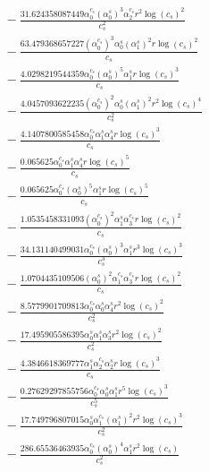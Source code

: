 \documentclass[10pt]{article}
\begin{document}
\begin{align*}
&{}  - \frac{31.624358087449 \alpha_{0}^{c_s} \left(\alpha_{0}^s\right)^{3} \alpha_{2}^{c_s} r^{2} \log{\left(c_{s} \right)}^{2}}{c_{s}^{2}} \\
&{}  - \frac{63.479368657227 \left(\alpha_{0}^{c_s}\right)^{3} \alpha_{0}^s \left(\alpha_{1}^s\right)^{2} r \log{\left(c_{s} \right)}^{2}}{c_{s}} \\
&{}  - \frac{4.0298219544359 \alpha_{0}^{c_s} \left(\alpha_{0}^s\right)^{5} \alpha_{1}^s r \log{\left(c_{s} \right)}^{3}}{c_{s}} \\
&{}  - \frac{4.0457093622235 \left(\alpha_{0}^{c_s}\right)^{2} \alpha_{0}^s \left(\alpha_{1}^s\right)^{2} r^{2} \log{\left(c_{s} \right)}^{4}}{c_{s}^{2}} \\
&{}  - \frac{4.1407800585458 \alpha_{0}^{c_s} \alpha_{1}^s \alpha_{4}^s r \log{\left(c_{s} \right)}^{3}}{c_{s}} \\
&{}  - \frac{0.065625 \alpha_{0}^{c_s} \alpha_{1}^s \alpha_{4}^s r \log{\left(c_{s} \right)}^{5}}{c_{s}} \\
&{}  - \frac{0.065625 \alpha_{0}^{c_s} \left(\alpha_{0}^s\right)^{5} \alpha_{1}^s r \log{\left(c_{s} \right)}^{5}}{c_{s}} \\
&{}  - \frac{1.0535458331093 \left(\alpha_{0}^{c_s}\right)^{2} \alpha_{1}^s \alpha_{3}^{c_s} r \log{\left(c_{s} \right)}^{2}}{c_{s}} \\
&{}  - \frac{34.131140499031 \alpha_{0}^{c_s} \left(\alpha_{0}^s\right)^{3} \alpha_{1}^s r^{3} \log{\left(c_{s} \right)}^{3}}{c_{s}^{3}} \\
&{}  - \frac{1.0704435109506 \left(\alpha_{0}^s\right)^{2} \alpha_{1}^{c_s} \alpha_{3}^{c_s} r \log{\left(c_{s} \right)}^{2}}{c_{s}} \\
&{}  - \frac{8.5779901709813 \alpha_{0}^{c_s} \alpha_{0}^s \alpha_{4}^s r^{2} \log{\left(c_{s} \right)}^{2}}{c_{s}^{2}} \\
&{}  - \frac{17.495905586395 \alpha_{0}^s \alpha_{1}^s \alpha_{3}^s r^{2} \log{\left(c_{s} \right)}^{2}}{c_{s}^{2}} \\
&{}  - \frac{4.3846618369777 \alpha_{1}^s \alpha_{2}^{c_s} \alpha_{2}^s r \log{\left(c_{s} \right)}^{3}}{c_{s}} \\
&{}  - \frac{0.27629297855756 \alpha_{0}^{c_s} \alpha_{0}^s \alpha_{1}^s r^{5} \log{\left(c_{s} \right)}^{3}}{c_{s}^{5}} \\
&{}  - \frac{17.749796807015 \alpha_{0}^s \alpha_{1}^{c_s} \left(\alpha_{1}^s\right)^{2} r^{2} \log{\left(c_{s} \right)}^{3}}{c_{s}^{2}} \\
&{}  - \frac{286.65536463935 \alpha_{0}^{c_s} \left(\alpha_{0}^s\right)^{4} \alpha_{1}^s r^{2} \log{\left(c_{s} \right)}}{c_{s}^{2}} \\

\end{align*}
\end{document}
